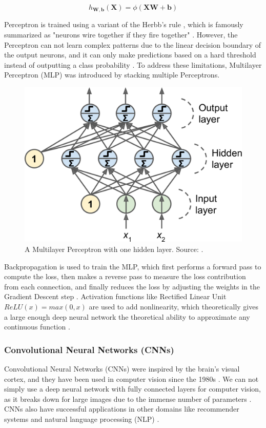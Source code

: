 \documentclass[a4paper, 11pt, oneside]{article}
\begin{document}
$$h_{\mathbf{W,b}}(\mathbf{X}) = \phi(\mathbf{XW} + \mathbf{b})$$

Perceptron is trained using a variant of the Herbb's rule \cite{hebb2005organization}, which is famously summarized
as "neurons wire together if they fire together" \cite{lowel1992selection}. However, the Perceptron
can not learn complex patterns due to the linear decision boundary of the output neurons, and it can only make predictions
based on a hard threshold instead of outputting a class probability \cite{geron2019hands}. To address these limitations,
Multilayer Perceptron (MLP) was introduced by stacking multiple Perceptrons.

\begin{figure}[ht]
  \begin{center}
    \includegraphics[width=.5\textwidth]{mlp.png}
  \end{center}
  \caption{A Multilayer Perceptron with one hidden layer. Source: \cite{geron2019hands}.}
\end{figure}

Backpropagation \cite{rumelhart1985learning} is used to train the MLP, which first performs a forward pass to compute
the loss, then makes a reverse pass to measure the loss contribution from each connection, and finally reduces the
loss by adjusting the weights in the Gradient Descent \cite{ruder2016overview} step \cite{geron2019hands}. Activation
functions like Rectified Linear Unit $ReLU(x) = max(0, x)$ are used to add nonlinearity, which theoretically gives a
large enough deep neural network the theoretical ability to approximate any continuous function \cite{geron2019hands}.

\subsubsection{Convolutional Neural Networks (CNNs)}

\label{sec:cnn}

Convolutional Neural Networks (CNNs) \cite{lecun1989backpropagation} were inspired by the brain's visual cortex,
and they have been used in computer vision since the 1980s \cite{geron2019hands}. We can not simply use a deep neural
network with fully connected layers for computer vision, as it breaks down for large images due to the immense
number of parameters \cite{geron2019hands}. CNNs also have successful applications in other domains like recommender
systems \cite{van2013deep} and natural language processing (NLP) \cite{collobert2008unified}.
\end{document}
